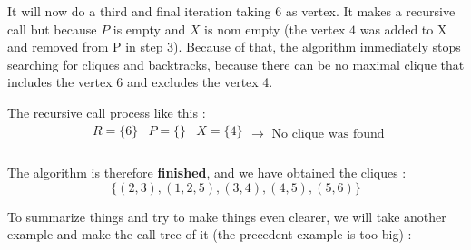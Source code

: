 \begin{minipage}{0.6\textwidth}
    It will now do a third and final iteration taking 6 as vertex. It makes a recursive call but because $P$ is empty and $X$ is nom empty (the vertex $4$ was added to X and removed from P in step 3). Because of that, the algorithm immediately stops searching for cliques and backtracks, because there can be no maximal clique that includes the  vertex 6 and excludes the vertex 4.
\end{minipage}
The recursive call process like this  :
$$ \boxed{
        \begin{array}{lll}
            R = \{6\} & P = \{\} & X = \{4\} \\
        \end{array}
        \rightarrow \text{ No clique was found}
    }$$
\\
The algorithm is therefore \textbf{finished}, and we have obtained the cliques :
$$\{(2,3),(1,2,5),(3,4),(4,5),(5,6)\}$$

To summarize things and try to make things even clearer, we will take another example and make the call tree of it (the precedent example is too big) :

